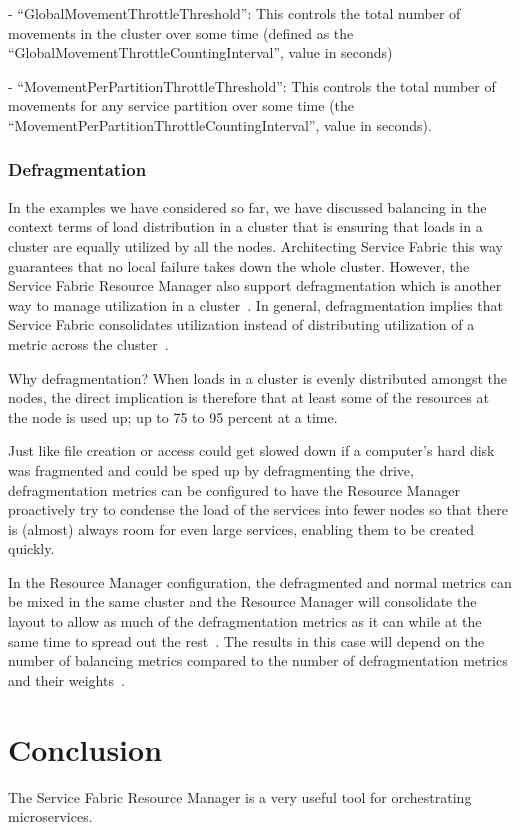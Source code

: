 - ``GlobalMovementThrottleThreshold'': This controls the
  total number of movements in the cluster over some time
  (defined as the
  ``GlobalMovementThrottleCountingInterval'', value in seconds)

- ``MovementPerPartitionThrottleThreshold'': This controls
  the total
  number of movements for any service partition 
  over some time (the
  ``MovementPerPartitionThrottleCountingInterval'', 
  value in seconds).


\subsubsection{Defragmentation}
In the examples we have considered so far, we have discussed balancing
in the context terms of load distribution in a cluster that is 
ensuring that loads in a cluster are equally utilized by all the
nodes. Architecting Service Fabric this way guarantees that no local
failure takes down the whole cluster.  However, the Service Fabric
Resource Manager also support defragmentation which is another way to
manage utilization in a cluster~\cite{hid-sp18-501-defrag}. 
In general, defragmentation implies
that Service Fabric consolidates utilization instead of distributing
utilization of a metric across the cluster~\cite{hid-sp18-501-defrag}.

Why defragmentation? When loads in a cluster is evenly distributed
amongst the nodes, the direct implication is therefore that at least
some of the resources at the node is used up; up to 75 to 95 percent
at a time.

Just like file creation or access could get slowed down if a
computer's hard disk was fragmented and could be sped up by
defragmenting the drive, defragmentation metrics can be configured to
have the Resource Manager proactively try to condense the load of the
services into fewer nodes so that there is (almost) always room for
even large services, enabling them to be created quickly.

In the Resource Manager configuration, the defragmented and normal
metrics can be mixed in the same cluster and the Resource Manager will
consolidate the layout to allow as much of the
defragmentation metrics as it can while at the same time to spread out the
rest~\cite{hid-sp18-501-defrag}. The results in this case will depend 
on the number of balancing
metrics compared to the number of defragmentation metrics and their
weights~\cite{hid-sp18-501-description}.


\section{Conclusion}
The Service Fabric Resource Manager is a very useful tool for orchestrating 
microservices.

